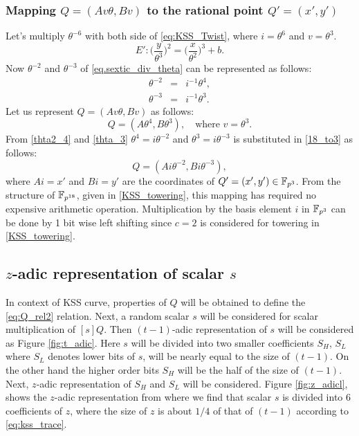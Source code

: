 \subsubsection{Mapping $Q = (Av\theta, Bv)$  to the rational point  $Q' = (x',y')$}

Let's multiply  $\theta^{-6}$ with both side of \eqref{eq:KSS_Twist}, where $i=\theta^6$ and $v = \theta^3$.
\begin{equation}\label{eq.sextic_div_theta}
E':  \Big(\frac{y}{\theta^3}\Big)^2  = \Big(\frac{x}{\theta^2}\Big)^3+ b.
\end{equation}
 Now $\theta^{-2}$ and $\theta^{-3}$ of  \eqref{eq.sextic_div_theta} can be represented as follows:
 \begin{subequations}
 \begin{eqnarray}
 \theta^{-2} &  = & i^{-1}\theta^{4}, \label{thta2_4} \\
 \theta^{-3} &  = & i^{-1}\theta^{3}.\label{thta_3} 
 \end{eqnarray}
 \end{subequations}
Let us represent $Q = (Av\theta, Bv)$  as follows:
\begin{equation}\label{18_to3}
Q  =  (A\theta^4, B\theta^3), \quad \text{where $v=\theta^3$}.
\end{equation}
From \eqref{thta2_4} and \eqref{thta_3} $ \theta^4 = i\theta^{-2}$ and $\theta^3 = i\theta^{-3}$  is substituted in \eqref{18_to3}  as 
follows:
\begin{equation}\label{18_to3.1}
Q  =  (Ai\theta^{-2}, Bi\theta^{-3}),
\end{equation}
where $Ai = x'$ and $Bi = y'$ are the coordinates of $Q' =(x',y') \in \mathbb{F}_{p^3}$. 
 From the structure of $\mathbb{F}_{p^{18}}$, given in \ref{KSS_towering}, this mapping has required no expensive arithmetic operation. Multiplication by the basis element $i$ in $\mathbb{F}_{p^3}$ can be done by 1 bit wise left shifting since $c=2$ is considered for towering in \ref{KSS_towering}.


\subsection{$z$-adic representation of scalar $s$} 
In context of KSS curve, properties of $Q$ will be obtained to define the \eqref{eq:Q_rel2} relation.
Next, a random scalar $s$ will be considered for scalar multiplication of $[s]Q$. Then $(t-1)$-adic representation of $s$ will be considered as Figure \ref{fig:t_adic}. Here $s$ will be divided into two smaller coefficients $S_H$, $S_L$ where  $S_L$ denotes lower bits of $s$,  will be nearly equal to the size of $(t-1)$. On the other hand the higher order bits $S_H$ will be the half of the size of $(t-1)$. Next, $z$-adic representation of $S_H$ and $S_L$ will be considered. Figure \ref{fig:z_adicl}, shows the $z$-adic representation from where we find that scalar $s$ is divided into 6 coefficients of $z$, where the size of $z$ is about $1/4$ of that of $(t-1)$ according to \eqref{eq:kss_trace}. 

